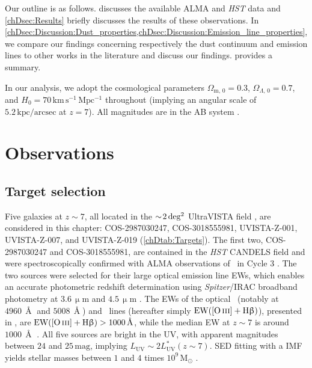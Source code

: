 Our outline is as follows.  discusses the available ALMA and \textit{HST} data and \cref{chDsec:Results} briefly discusses the results of these observations. In \cref{chDsec:Discussion:Dust_properties,chDsec:Discussion:Emission_line_properties}, we compare our findings concerning respectively the dust continuum and emission lines to other works in the literature and discuss our findings.  provides a summary.

In our analysis, we adopt the cosmological parameters $\Omega_{\text{m}, \, 0} = 0.3$, $\Omega_{\Lambda, \, 0} = 0.7$, and $H_0 = 70 \, \mathrm{km \, s^{-1} \, Mpc^{-1}}$ throughout (implying an angular scale of $5.2 \, \mathrm{kpc/arcsec}$ at $z=7$). All magnitudes are in the AB system \citep{1983ApJ...266..713O}.

\section{Observations}
\label{chDsec:Observations}

\subsection{Target selection}
\label{chDssec:Observations:Target_selection}

Five galaxies at $z \sim 7$, all located in the $\sim \! 2 \, \mathrm{deg^2}$ UltraVISTA field \citep[UVISTA;][]{2012A&A...544A.156M}, are considered in this chapter: COS-2987030247, COS-3018555981, UVISTA-Z-001, UVISTA-Z-007, and UVISTA-Z-019 (\cref{chDtab:Targets}). The first two, COS-2987030247 and COS-3018555981, are contained in the \textit{HST} CANDELS field \citep{2011ApJS..197...35G} and were spectroscopically confirmed with ALMA observations of \CIILam\ in Cycle 3 \citep[ALMA project code 2015.1.01111.S;][]{2018Natur.553..178S}. The two sources were selected for their large optical emission line EWs, which enables an accurate photometric redshift determination using \textit{Spitzer}/IRAC broadband photometry at $3.6 \, \upmu\mathrm{{m}}$ and $4.5 \, \upmu\mathrm{{m}}$ \citep[see][ for details]{2015ApJ...801..122S}. The EWs of the optical \OIIIf\ (notably at $4960 \, \Angstrom$ and $5008 \, \Angstrom$) and \Hbeta\ lines (hereafter simply $\text{EW} ( \OIIIf + \Hbeta )$), presented in \citet{2015ApJ...801..122S}, are $\text{EW} ( \OIIIf + \Hbeta ) > \num{1000} \, \Angstrom$, while the median EW at $z \sim 7$ is around $\num{1000} \, \Angstrom$ \citep[see e.g.][]{2021MNRAS.500.5229E}. All five sources are bright in the UV, with apparent magnitudes between $24$ and $25 \, \mathrm{mag}$, implying $L_\text{UV} \sim 2 L_\text{UV}^* (z \sim 7)$. SED fitting with a \citet{2003PASP..115..763C} IMF yields stellar masses between $1$ and $4$ times $10^9 \, \mathrm{M_\odot}$ \citep[; see \cref{chDtab:Targets}]{2018Natur.553..178S, 2022ApJ...928...31S}.

